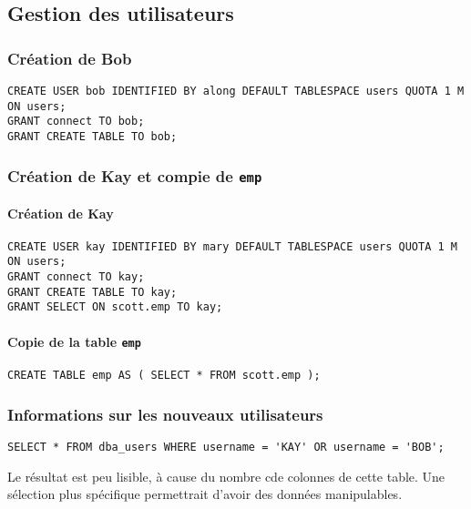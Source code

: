 \subsection{Gestion des utilisateurs}

\subsubsection{Création de Bob}

\begin{verbatim}
CREATE USER bob IDENTIFIED BY along DEFAULT TABLESPACE users QUOTA 1 M ON users;
GRANT connect TO bob;
GRANT CREATE TABLE TO bob;

\end{verbatim}

\subsubsection{Création de Kay et compie de \texttt{emp}}

\paragraph{Création de Kay}
\begin{verbatim}
CREATE USER kay IDENTIFIED BY mary DEFAULT TABLESPACE users QUOTA 1 M ON users;
GRANT connect TO kay;
GRANT CREATE TABLE TO kay;
GRANT SELECT ON scott.emp TO kay;
\end{verbatim}

\paragraph{Copie de la table \texttt{emp}}

\begin{verbatim}
CREATE TABLE emp AS ( SELECT * FROM scott.emp );
\end{verbatim}

\subsubsection{Informations sur les nouveaux utilisateurs} 

\begin{verbatim}
SELECT * FROM dba_users WHERE username = 'KAY' OR username = 'BOB';
\end{verbatim}

Le résultat est peu lisible, à cause du nombre cde colonnes de cette table.
Une sélection plus spécifique permettrait d’avoir des données manipulables.

